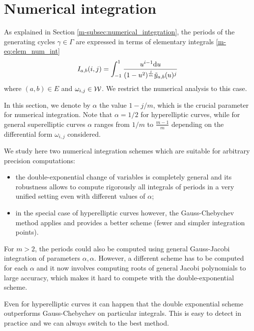 \documentclass[main.tex]{subfiles}
\begin{document}
\section{Numerical integration}\label{sec:numerical_integration}

As explained in Section \ref{m-subsec:numerical_integration}, the periods
of the generating cycles $\gamma\in \Gamma$ are expressed in terms of
elementary integrals
\eqref{m-eq:elem_num_int}
\begin{equation*}
    I_{a,b}(i,j) = \int_{-1}^1\frac{u^{i-1}\mathrm d u}{(1-u^2)^{\frac jm}\tilde{y}_{a,b}(u)^j}
\end{equation*}
where $(a,b)\in E$ and $\omega_{i,j}\in\mathcal{W}$.
We restrict the numerical analysis to this case.

In this section, we denote by $α$ the value $1-j/m$, which is the crucial parameter for numerical integration.
Note that $α=1/2$ for hyperelliptic curves, while for general superelliptic curves $α$ ranges
from $1/m$ to $\frac{m-1}m$ depending on the differential form $\omega_{i,j}$ considered.

We study here two numerical integration schemes which are suitable for arbitrary
precision computations:
\begin{itemize}
    \item
        the double-exponential change of variables is completely general \cite{Molin2010} and its robustness
allows to compute rigorously all integrals of periods in a very unified setting
even with different values of $\alpha$;
\item in the special case of hyperelliptic curves however,
    the Gauss-Chebychev method \cite[25.4.38]{AbramowitzStegun} applies and
    provides a better scheme (fewer and simpler integration points).
\end{itemize}
For $m > 2$, the periods could also be computed using general Gauss-Jacobi integration
of parameters $\alpha,\alpha$. However, a different scheme has to be computed for each $\alpha$
and it now involves computing roots of general Jacobi polynomials to large accuracy, which
makes it hard to compete with the double-exponential scheme.

\begin{rmk}
    Even for hyperelliptic curves it can happen that the double exponential scheme outperforms Gauss-Chebychev on
    particular integrals. This is easy to detect in practice and we can always switch to
    the best method.
\end{rmk}
\end{document}
